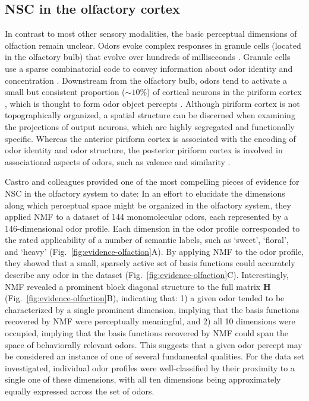 \subsection*{NSC in the olfactory cortex}

In contrast to most other sensory modalities, 
the basic perceptual dimensions of olfaction remain unclear.
Odors evoke complex responses in granule cells (located in the olfactory bulb)
that evolve over hundreds of milliseconds \cite{Broome2006}.
Granule cells use a sparse combinatorial code to convey information about odor identity
and concentration \cite{Koulakov2011,Gupta2015}.
Downstream from the olfactory bulb, odors tend to activate a small but consistent
proportion ($\sim 10\%$) of cortical neurons in the piriform cortex \cite{poo2009},
which is thought to form odor object percepts \cite{chen2014,stettler2009}.
Although piriform cortex is not topographically organized,
a spatial structure can be discerned when examining the projections of output neurons,
which are highly segregated and functionally specific.
Whereas the anterior piriform cortex is associated with the encoding of 
odor identity and odor structure, 
the posterior piriform cortex is involved in associational aspects of odors, 
such as valence and similarity \cite{chen2014,gottfried2006}.

Castro and colleagues \cite{Castro2013} provided 
one of the most compelling pieces of evidence for \ac{NSC}
in the olfactory system to date:
In an effort to elucidate the dimensions along which perceptual space might be
organized in the olfactory system,
they applied \ac{NMF} to a dataset of 144 monomolecular odors,
each represented by a 146-dimensional odor profile.
Each dimension in the odor profile corresponded to the rated applicability of
a number of semantic labels, such as `sweet', `floral', and `heavy'
(Fig.~\ref{fig:evidence-olfaction}A).
By applying \ac{NMF} to the odor profile, they showed that a small, sparsely active set of basis functions could accurately describe any odor in the dataset
(Fig.~\ref{fig:evidence-olfaction}C).
Interestingly, \ac{NMF} revealed a prominent block
diagonal structure to the full matrix \textbf{H}
(Fig.~\ref{fig:evidence-olfaction}B), indicating that:
1) a given odor tended to be characterized by a single prominent dimension,
implying that the basis functions recovered by \ac{NMF} were perceptually meaningful,
and 2) all 10 dimensions were occupied,
implying that the basis functions recovered by \ac{NMF} could span the space of
behaviorally relevant odors.
This suggests that a given odor percept may be considered an 
instance of one of several fundamental qualities.
For the data set investigated, individual odor profiles were well-classified 
by their proximity to a single one of these dimensions, 
with all ten dimensions being approximately equally expressed 
across the set of odors.

